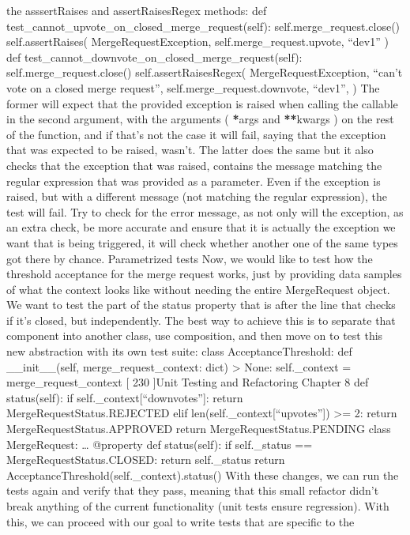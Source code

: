 \documentclass[a4paper,10pt,english]{sphinxmanual}
\begin{document}
the asssertRaises and assertRaisesRegex methods:
def test\_cannot\_upvote\_on\_closed\_merge\_request(self):
self.merge\_request.close()
self.assertRaises(
MergeRequestException, self.merge\_request.upvote, “dev1”
)
def test\_cannot\_downvote\_on\_closed\_merge\_request(self):
self.merge\_request.close()
self.assertRaisesRegex(
MergeRequestException,
“can’t vote on a closed merge request”,
self.merge\_request.downvote,
“dev1”,
)
The former will expect that the provided exception is raised when calling the callable in the
second argument, with the arguments ( {\color{red}\bfseries{}*}args and {\color{red}\bfseries{}**}kwargs ) on the rest of the function,
and if that’s not the case it will fail, saying that the exception that was expected to be raised,
wasn’t. The latter does the same but it also checks that the exception that was raised,
contains the message matching the regular expression that was provided as a parameter.
Even if the exception is raised, but with a different message (not matching the regular
expression), the test will fail.
Try to check for the error message, as not only will the exception, as an
extra check, be more accurate and ensure that it is actually the exception
we want that is being triggered, it will check whether another one of the
same types got there by chance.
Parametrized tests
Now, we would like to test how the threshold acceptance for the merge request works, just
by providing data samples of what the context looks like without needing the entire
MergeRequest object. We want to test the part of the status property that is after the line
that checks if it’s closed, but independently.
The best way to achieve this is to separate that component into another class, use
composition, and then move on to test this new abstraction with its own test suite:
class AcceptanceThreshold:
def \_\_init\_\_(self, merge\_request\_context: dict) \sphinxhyphen{}\textgreater{} None:
self.\_context = merge\_request\_context
{[} 230 {]}Unit Testing and Refactoring
Chapter 8
def status(self):
if self.\_context{[}“downvotes”{]}:
return MergeRequestStatus.REJECTED
elif len(self.\_context{[}“upvotes”{]}) \textgreater{}= 2:
return MergeRequestStatus.APPROVED
return MergeRequestStatus.PENDING
class MergeRequest:
…
@property
def status(self):
if self.\_status == MergeRequestStatus.CLOSED:
return self.\_status
return AcceptanceThreshold(self.\_context).status()
With these changes, we can run the tests again and verify that they pass, meaning that this
small refactor didn’t break anything of the current functionality (unit tests ensure
regression). With this, we can proceed with our goal to write tests that are specific to the
\end{document}
